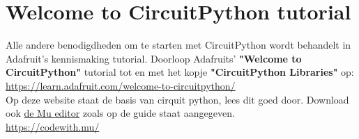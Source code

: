 	
	
	



\section{Welcome to CircuitPython tutorial}\label{sec:CircuitPythonTutorial}
	Alle andere benodigdheden om te starten met CircuitPython wordt behandelt in Adafruit's kennismaking tutorial. Doorloop Adafruits' \textbf{"Welcome to CircuitPython"} tutorial tot en met het kopje \textbf{"CircuitPython Libraries"} op:\\
	
	\url{https://learn.adafruit.com/welcome-to-circuitpython/} \\

Op deze website staat de basis van cirquit python, lees dit goed door. Download ook \href{https://codewith.mu/}{de Mu editor} zoals op de guide staat aangegeven. \\
	
	\url{https://codewith.mu/}


